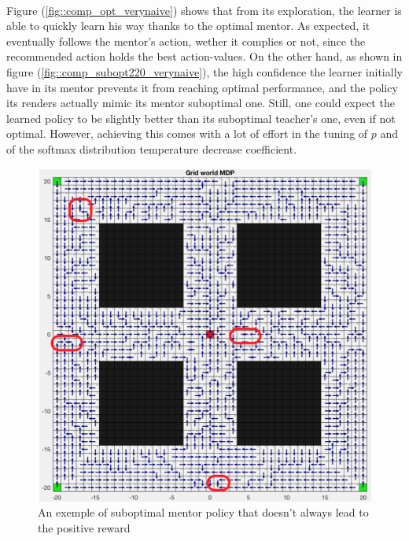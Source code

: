 \documentclass[a4paper]{report}
\begin{document}
{{{			\paragraph{} Figure (\ref{fig::comp_opt_verynaive}) shows that from its exploration, the learner is able to quickly learn his way thanks to the optimal mentor. As expected, it eventually follows the mentor's action, wether it complies or not, since the recommended action holds the best action-values. On the other hand, as shown in figure (\ref{fig::comp_subopt220_verynaive}), the high confidence the learner initially have in its mentor prevents it from reaching optimal performance, and the policy its renders actually mimic its mentor suboptimal one. Still, one could expect the learned policy to be slightly better than its suboptimal teacher's one, even if not optimal. However, achieving this comes with a lot of effort in the tuning of $p$ and of the softmax distribution temperature decrease coefficient. 
	
			\begin{figure}[ht!]
				\begin{center}
					\includegraphics[width=0.7\linewidth]{subopt_policy_block}
					\caption{An exemple of suboptimal mentor policy that doesn't always lead to the positive reward}
					\label{subopt_policy_block}
				\end{center}
			\end{figure}
			
}}}
\end{document}
